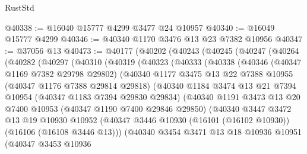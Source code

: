 \begin{lexlean}{RustStd}
\begin{coremodule}
@40338 := @16040 @15777 @4299 @3477 @24 @10957
@40340 := @16049 @15777 @4299
@40346 := @40340 @1170 @3476 @13 @23 @7382 @10956
@40347 := @37056 @13
@40473 := @40177
    (@40202
      (@40243
        (@40245
          (@40247
            (@40264
              (@40282
                (@40297
                  (@40310
                    (@40319
                      (@40323
                        (@40333
                          (@40338
                            (@40346
                              (@40347 @1169 @7382 @29798 @29802)
                              (@40340
                                @1177
                                @3475
                                @13
                                @22
                                @7388
                                @10955
                                (@40347 @1176 @7388 @29814 @29818)
                                (@40340
                                  @1184
                                  @3474
                                  @13
                                  @21
                                  @7394
                                  @10954
                                  (@40347 @1183 @7394 @29830 @29834)
                                  (@40340
                                    @1191
                                    @3473
                                    @13
                                    @20
                                    @7400
                                    @10953
                                    (@40347 @1190 @7400 @29846 @29850)
                                    (@40340
                                      @3447
                                      @3472
                                      @13
                                      @19
                                      @10930
                                      @10952
                                      (@40347
                                        @3446
                                        @10930
                                        (@16101 (@16102 @10930))
                                        (@16106 (@16108 @3446 @13)))
                                      (@40340
                                        @3454
                                        @3471
                                        @13
                                        @18
                                        @10936
                                        @10951
                                        (@40347
                                          @3453
                                          @10936

\end{coremodule}
\end{lexlean}
